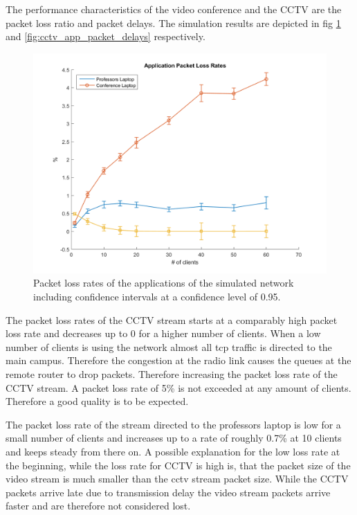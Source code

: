 \documentclass[
10pt, %
a4paper, %
oneside, %
headinclude,footinclude, %
BCOR5mm, %
]{scrartcl}
\begin{document}
The performance characteristics of the video conference and the CCTV are the packet loss ratio and packet delays. The simulation results are depicted in fig \ref{fig:cctv_app_packet_loss_rates} and \ref{fig:cctv_app_packet_delays} respectively.
\begin{figure}[!ht]
  \centering
  \includegraphics[width=\textwidth]{Figures/cctv/Application_Packet_Loss_Rates.png}
  \caption{Packet loss rates of the applications of the simulated network including confidence intervals at a confidence level of 0.95.} \label{fig:cctv_app_packet_loss_rates}
\end{figure}

The packet loss rates of the CCTV stream starts at a comparably high packet loss rate and decreases up to 0 for a higher number of clients. When a low number of clients is using the network almost all tcp traffic is directed to the main campus. Therefore the congestion at the radio link causes the queues at the remote router to drop packets. Therefore increasing the packet loss rate of the CCTV stream. A packet loss rate of 5\% is not exceeded at any amount of clients. Therefore a good quality is to be expected.

The packet loss rate of the stream directed to the professors laptop is low for a small number of clients and increases up to a rate of roughly 0.7\% at 10 clients and keeps steady from there on. A possible explanation for the low loss rate at the beginning, while the loss rate for CCTV is high is, that the packet size of the video stream is much smaller than the cctv stream packet size. While the CCTV packets arrive late due to transmission delay the video stream packets arrive faster and are therefore not considered lost.
\end{document}
